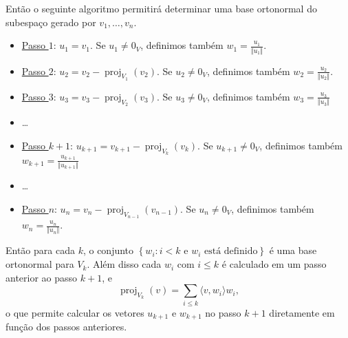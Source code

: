 \begin{theorem}
Então o seguinte algoritmo permitirá determinar uma base ortonormal do subespaço gerado por $v_1,\ldots,v_n$.
\begin{itemize}
	\item \uline{Passo $1$}: $u_1=v_1$. Se $u_1\neq 0_V$, definimos também $w_1=\frac{u_1}{\Vert u_1\Vert}$.
	\item \uline{Passo $2$}: $u_2=v_2-\operatorname{proj}_{V_1}(v_2)$. Se $u_2\neq 0_V$, definimos também $w_2=\frac{u_2}{\Vert u_2\Vert}$.
	\item \uline{Passo $3$}: $u_3=v_3-\operatorname{proj}_{V_2}(v_3)$. Se $u_3\neq 0_V$, definimos também $w_3=\frac{u_3}{\Vert u_3\Vert}$
	\item \ldots
	\item \uline{Passo $k+1$}: $u_{k+1}=v_{k+1}-\operatorname{proj}_{V_k}(v_k)$. Se $u_{k+1}\neq 0_V$, definimos também $w_{k+1}=\frac{u_{k+1}}{\Vert u_{k+1}\Vert}$
	\item \ldots
	\item \uline{Passo $n$}: $u_n=v_n-\operatorname{proj}_{V_{n-1}}(v_{n-1})$. Se $u_n\neq 0_V$, definimos também $w_n=\frac{u_n}{\Vert u_n\Vert}$.
\end{itemize}
Então para cada $k$, o conjunto $\left\{w_i:i\lt k\text{ e }w_i\text{ está definido}\right\}$ é uma base ortonormal para $V_k$. Além disso cada $w_i$ com $i\leq k$ é calculado em um passo anterior ao passo $k+1$, e
\[\operatorname{proj}_{V_k}(v)=\sum_{i\leq k}\langle v,w_i\rangle w_i,\]
o que permite calcular os vetores $u_{k+1}$ e $w_{k+1}$ no passo $k+1$ diretamente em função dos passos anteriores.
\end{theorem}

